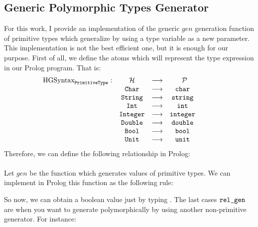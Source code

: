 	\subsection{Generic Polymorphic Types Generator}
	For this work, I provide an implementation of the generic $gen$ generation function of primitive types which generalize by using a type variable as a new parameter. This implementation is not the best efficient one, but it is enough for our purpose. First of all, we define the atoms which will represent the type expression in our Prolog program. That is:
	\begin{equation*}
		\begin{matrix}
			\text{HGSyntax}_{\texttt{PrimitiveType}}: & \mathcal{H}   & \longrightarrow & \;\; \mathcal{P} &   &   &   \\
			                                & \texttt{Char}    & \longrightarrow & \texttt{char}       &   &   &   \\
			                                & \texttt{String}  & \longrightarrow & \texttt{string}     &   &   &   \\
			                                & \texttt{Int}     & \longrightarrow & \texttt{int}        &   &   &   \\
			                                & \texttt{Integer} & \longrightarrow & \texttt{integer}    &   &   &   \\
			                                & \texttt{Double}  & \longrightarrow & \texttt{double}     &   &   &   \\
			                                & \texttt{Bool}    & \longrightarrow & \texttt{bool}       &   &   &   \\
			                                & \texttt{Unit}    & \longrightarrow & \texttt{unit}       &   &   &   \\
		\end{matrix}
	\end{equation*}
	Therefore, we can define the following relationship in Prolog:\\\\
	Let $gen$ be the function which generates values of primitive types. We can implement in Prolog this function as the following rule:
	
	So now, we can obtain a boolean value just by typing . The last cases $\texttt{rel\_gen}$ are when you want to generate polymorphically by using another non-primitive generator. For instance:\\\\
